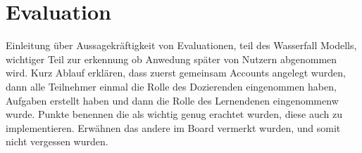 \chapter{Evaluation}
Einleitung über Aussagekräftigkeit von Evaluationen, teil des Wasserfall Modells, wichtiger Teil zur erkennung ob Anwedung später von Nutzern abgenommen wird.
Kurz Ablauf erklären, dass zuerst gemeinsam Accounts angelegt wurden, dann alle Teilnehmer einmal die Rolle des Dozierenden eingenommen haben, Aufgaben erstellt haben und dann die Rolle des Lernendenen eingenommenw wurde.
Punkte benennen die als wichtig genug erachtet wurden, diese auch zu implementieren. Erwähnen das andere im Board vermerkt wurden, und somit nicht vergessen wurden.